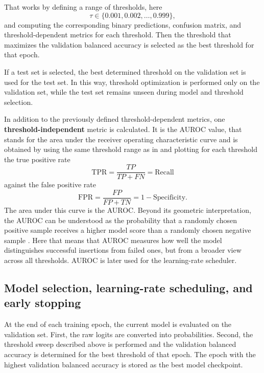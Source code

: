 That works by defining a range of thresholds, here
\begin{equation}
\tau \in \{0.001, 0.002, \dots, 0.999\},
\label{eq:threshold}
\end{equation}
and computing the corresponding binary predictions, confusion matrix, and threshold-dependent metrics for each threshold. Then the threshold that maximizes the validation balanced accuracy is selected as the best threshold for that epoch.

If a test set is selected, the best determined threshold on the validation set is used for the test set. In this way, threshold optimization is performed only on the validation set, while the test set remains unseen during model and threshold selection.

In addition to the previously defined threshold-dependent metrics, one \textbf{threshold-independent} metric is calculated. It is the AUROC value, that stands for the area under the receiver operating characteristic curve and is obtained by using the same threshold range as in  and plotting for each threshold the true positive rate
\begin{equation}
\mathrm{TPR} = \frac{TP}{TP+FN} = \text{Recall}
\end{equation}
against the false positive rate
\begin{equation}
\mathrm{FPR} = \frac{FP}{FP+TN} = 1 - \text{Specificity}.
\end{equation}
The area under this curve is the AUROC. Beyond its geometric interpretation, the AUROC can be understood as the probability that a randomly chosen positive sample receives a higher model score than a randomly chosen negative sample \cite{hanleyMeaningUseArea1982}. Here that means that AUROC measures how well the model distinguishes successful insertions from failed ones, but from a broader view across all thresholds. AUROC is later used for the learning-rate scheduler.

\subsection{Model selection, learning-rate scheduling, and early stopping}

At the end of each training epoch, the current model is evaluated on the validation set. First, the raw logits are converted into probabilities. Second, the threshold sweep described above is performed and the validation balanced accuracy is determined for the best threshold of that epoch. The epoch with the highest validation balanced accuracy is stored as the best model checkpoint.

